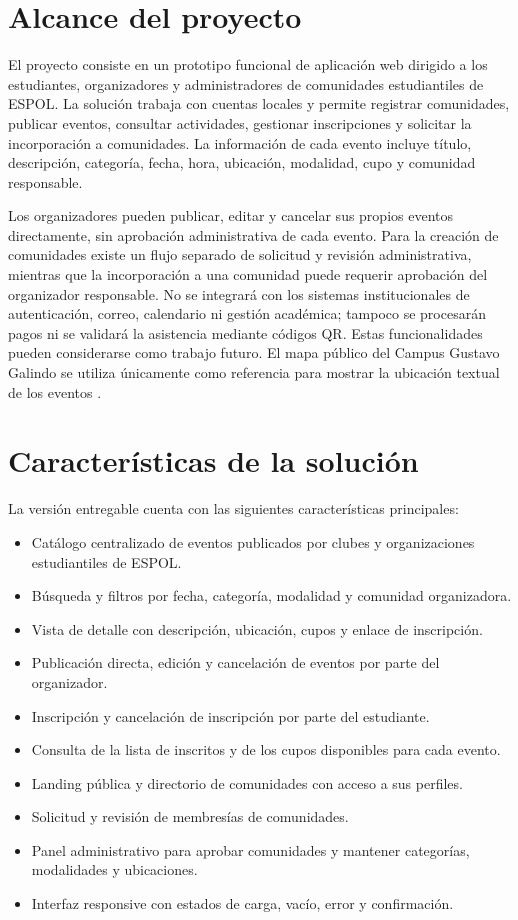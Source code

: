 \documentclass[12pt]{article}
\begin{document}
\section{Alcance del proyecto}

El proyecto consiste en un prototipo funcional de aplicación web dirigido a los estudiantes, organizadores y administradores de comunidades estudiantiles de ESPOL. La solución trabaja con cuentas locales y permite registrar comunidades, publicar eventos, consultar actividades, gestionar inscripciones y solicitar la incorporación a comunidades. La información de cada evento incluye título, descripción, categoría, fecha, hora, ubicación, modalidad, cupo y comunidad responsable.

Los organizadores pueden publicar, editar y cancelar sus propios eventos directamente, sin aprobación administrativa de cada evento. Para la creación de comunidades existe un flujo separado de solicitud y revisión administrativa, mientras que la incorporación a una comunidad puede requerir aprobación del organizador responsable. No se integrará con los sistemas institucionales de autenticación, correo, calendario ni gestión académica; tampoco se procesarán pagos ni se validará la asistencia mediante códigos QR. Estas funcionalidades pueden considerarse como trabajo futuro. El mapa público del Campus Gustavo Galindo se utiliza únicamente como referencia para mostrar la ubicación textual de los eventos \cite{mapacampus}.

\section{Características de la solución}

La versión entregable cuenta con las siguientes características principales:

\begin{itemize}
    \item Catálogo centralizado de eventos publicados por clubes y organizaciones estudiantiles de ESPOL.
    \item Búsqueda y filtros por fecha, categoría, modalidad y comunidad organizadora.
    \item Vista de detalle con descripción, ubicación, cupos y enlace de inscripción.
    \item Publicación directa, edición y cancelación de eventos por parte del organizador.
    \item Inscripción y cancelación de inscripción por parte del estudiante.
    \item Consulta de la lista de inscritos y de los cupos disponibles para cada evento.
    \item Landing pública y directorio de comunidades con acceso a sus perfiles.
    \item Solicitud y revisión de membresías de comunidades.
    \item Panel administrativo para aprobar comunidades y mantener categorías, modalidades y ubicaciones.
    \item Interfaz responsive con estados de carga, vacío, error y confirmación.
\end{itemize}
\end{document}
